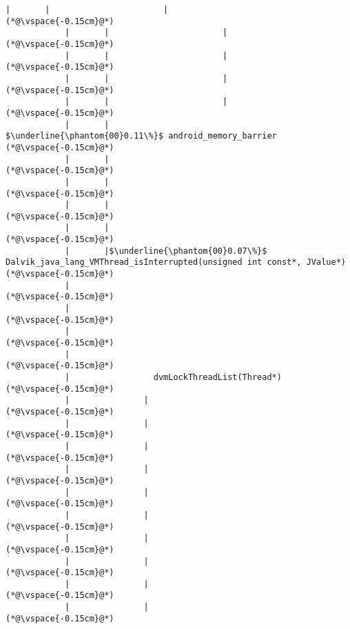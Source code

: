 \begin{lstlisting}[caption=Staattinen metodi Java$\to$C , label=profile:J2CBenchmark00001, numberbychapter=true, frame=lines, float, floatplacement=t]
            |       |                       |
(*@\vspace{-0.15cm}@*)
            |       |                       |
(*@\vspace{-0.15cm}@*)
            |       |                       |
(*@\vspace{-0.15cm}@*)
            |       |                       |
(*@\vspace{-0.15cm}@*)
            |       |                       |
(*@\vspace{-0.15cm}@*)
            |       |                        $\underline{\phantom{00}0.11\%}$ android_memory_barrier
(*@\vspace{-0.15cm}@*)
            |       |        
(*@\vspace{-0.15cm}@*)
            |       |        
(*@\vspace{-0.15cm}@*)
            |       |
(*@\vspace{-0.15cm}@*)
            |       |
(*@\vspace{-0.15cm}@*)
            |       |$\underline{\phantom{00}0.07\%}$ Dalvik_java_lang_VMThread_isInterrupted(unsigned int const*, JValue*)
(*@\vspace{-0.15cm}@*)
            |        
(*@\vspace{-0.15cm}@*)
            |        
(*@\vspace{-0.15cm}@*)
            |        
(*@\vspace{-0.15cm}@*)
            |        
(*@\vspace{-0.15cm}@*)
            |                 dvmLockThreadList(Thread*)
(*@\vspace{-0.15cm}@*)
            |               |
(*@\vspace{-0.15cm}@*)
            |               |
(*@\vspace{-0.15cm}@*)
            |               |
(*@\vspace{-0.15cm}@*)
            |               |
(*@\vspace{-0.15cm}@*)
            |               |
(*@\vspace{-0.15cm}@*)
            |               |
(*@\vspace{-0.15cm}@*)
            |               |
(*@\vspace{-0.15cm}@*)
            |               |
(*@\vspace{-0.15cm}@*)
            |               |
(*@\vspace{-0.15cm}@*)
            |               |
(*@\vspace{-0.15cm}@*)

\end{lstlisting}
